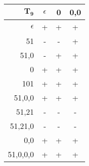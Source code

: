 \begingroup
\scriptsize
\begin{tabular}{r | c c c}
    $\mathbf{T_9}$ & $\epsilon$ & 0 & 0,0\\ \hline
    $\epsilon$ & + & + & + \\
    51 & - & - & + \\
    51,0 & - & + & + \\ \hline
    0 & + & + & + \\
    101 & + & + & + \\
    51,0,0 & + & + & + \\
    51,21 & - & - & - \\
    51,21,0 & - & - & - \\
    0,0 & + & + & + \\
    51,0,0,0 & + & + & +
\end{tabular}
\endgroup
